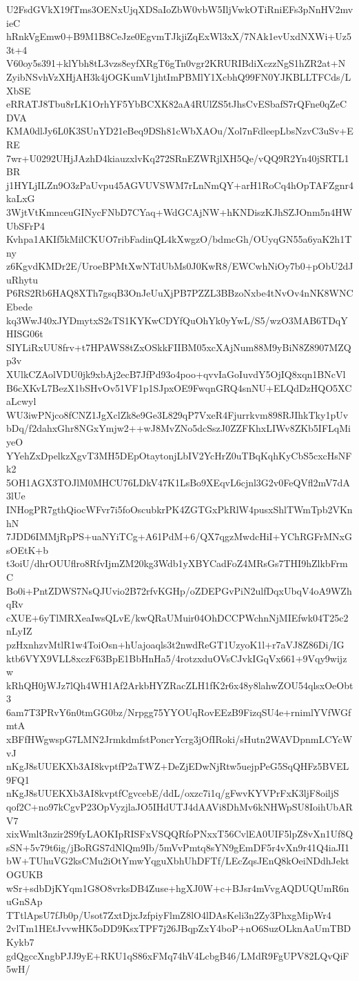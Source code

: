 U2FsdGVkX19fTms3OENxUjqXDSaIoZbW0vbW5IljVwkOTiRniEFs3pNnHV2mvieC
hRnkVgEmw0+B9M1B8CeJze0EgvmTJkjiZqExWl3xX/7NAk1evUxdNXWi+Uz53t+4
V60oy5s391+klYbh8tL3vzs8eyfXRgT6gTn0vgr2KRURIBdiXczzNgS1hZR2at+N
ZyibNSvhVzXHjAH3k4jOGKumV1jhtImPBMlY1XcbhQ99FN0YJKBLLTFCds/LXbSE
eRRATJ8Tbu8rLK1OrhYF5YbBCXK82aA4RUlZS5tJhsCvESbafS7rQFne0qZeCDVA
KMA0dlJy6L0K3SUnYD21eBeq9DSh81cWbXAOu/Xol7nFdleepLbsNzvC3uSv+ERE
7wr+U0292UHjJAzhD4kiauzxlvKq272SRnEZWRjlXH5Qe/vQQ9R2Yn40jSRTL1BR
j1HYLjILZn9O3zPaUvpu45AGVUVSWM7rLnNmQY+arH1RoCq4hOpTAFZgnr4kaLxG
3WjtVtKmnceuGINycFNbD7CYaq+WdGCAjNW+hKNDiszKJhSZJOnm5n4HWUbSFrP4
Kvhpa1AKIf5kMilCKUO7ribFadinQL4kXwgzO/bdmcGh/OUyqGN55a6yaK2h1Tny
z6KgvdKMDr2E/UroeBPMtXwNTdUbMs0J0KwR8/EWCwhNiOy7b0+pObU2dJuRhytu
P6RS2Rb6HAQ8XTh7gsqB3OnJeUuXjPB7PZZL3BBzoNxbe4tNvOv4nNK8WNCEbede
kq3WwJ40xJYDmytxS2sTS1KYKwCDYfQuOhYk0yYwL/S5/wzO3MAB6TDqYHISG06t
SIYLiRxUU8frv+t7HPAWS8tZxOSkkFIIBM05xcXAjNum88M9yBiN8Z8907MZQp3v
XUlkCZAolVDU0jk9xbAj2ecB7JfPd93o4poo+qvvIaGoIuvdY5OjIQ8xqn1BNcVl
B6cXKvL7BezX1bSHvOv51VF1p1SJpxOE9FwqnGRQ4snNU+ELQdDzHQO5XCaLcwyl
WU3iwPNjco8fCNZ1JgXclZk8e9Ge3L829qP7VxeR4Fjurrkvm898RJIhkTky1pUv
bDq/f2dahxGhr8NGxYmjw2++wJ8MvZNo5dcSszJ0ZZFKhxLIWv8ZKb5IFLqMiyeO
YYehZxDpelkzXgvT3MH5DEpOtaytonjLbIV2YcHrZ0uTBqKqhKyCbS5cxcHsNFk2
5OH1AGX3TOJlM0MHCU76LDkV47K1LsBo9XEqvL6cjnl3G2v0FeQVfl2mV7dA3lUe
INHogPR7gthQiocWFvr7i5foOscubkrPK4ZGTGxPkRlW4pusxShlTWmTpb2VKnhN
7JDD6IMMjRpPS+uaNYiTCg+A61PdM+6/QX7qgzMwdcHiI+YChRGFrMNxGsOEtK+b
t3oiU/dhrOUUflro8RfvIjmZM20kg3Wdb1yXBYCadFoZ4MRsGs7THI9hZlkbFrmC
Bo0i+PntZDWS7NsQJUvio2B72rfvKGHp/oZDEPGvPiN2ulfDqxUbqV4oA9WZhqRv
cXUE+6yTlMRXeaIwsQLvE/kwQRaUMuir04OhDCCPWchnNjMIEfwk04T25c2nLyIZ
pzHxnhzvMtlR1w4ToiOsn+hUajoaqls3t2nwdReGT1UzyoK1l+r7aVJ8Z86Di/IG
ktb6VYX9VLL8xczF63BpE1BbHnHa5/4rotzxduOVsCJvkIGqVx661+9Vqy9wijzw
kRhQH0jWJz7lQh4WH1Af2ArkbHYZRacZLH1fK2r6x48y8lahwZOU54qlsxOeObt3
6am7T3PRvY6n0tmGG0bz/Nrpgg75YYOUqRovEEzB9FizqSU4e+rnimlYVfWGfmtA
xBFfHWgwspG7LMN2JrmkdmfstPoncrYcrg3jOfIRoki/sHutn2WAVDpnmLCYcWvJ
nKgJ8sUUEKXb3AI8kvptfP2aTWZ+DeZjEDwNjRtw5uejpPeG5SqQHFz5BVEL9FQ1
nKgJ8sUUEKXb3AI8kvptfCgvcebE/ddL/oxzc7i1q/gFwvKYVPrFxK3ljF8oiljS
qof2C+no97kCgvP23OpVyzjlaJO5IHdUTJ4dAAVi8DhMv6kNHWpSU8IoihUbARV7
xixWmlt3nzir2S9fyLAOKIpRISFxVSQQRfoPNxxT56CvlEA0UIF5lpZ8vXn1Uf8Q
sSN+5v79t6ig/jBoRGS7dNlQm9Ib/5mVvPmtq8sYN9gEmDF5r4vXn9r41Q4iaJI1
bW+TUhuVG2ksCMu2iOtYmwYqguXbhUhDFTf/LEcZqsJEnQ8kOeiNDdhJektOGUKB
wSr+sdbDjKYqm1G8O8vrksDB4Zuse+hgXJ0W+c+BJsr4mVvgAQDUQUmR6nuGnSAp
TTtlApsU7fJb0p/Usot7ZxtDjxJzfpiyFlmZ8lO4lDAsKeli3n2Zy3PhxgMipWr4
2vlTm1HEtJvvwHK5oDD9KsxTPF7j26JBqpZxY4boP+nO6SuzOLknAaUmTBDKykb7
gdQgccXngbPJJ9yE+RKU1qS86xFMq74hV4LcbgB46/LMdR9FgUPV82LQvQiF5wH/
